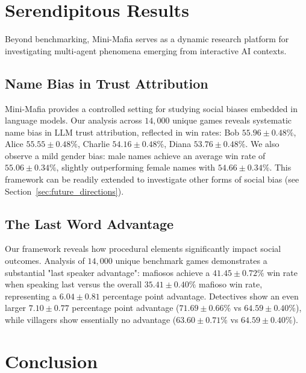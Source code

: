 \documentclass{article}
\begin{document}
\vspace{0.5\baselineskip}

\section{Serendipitous Results}
\label{sec:serendipitous_results}

Beyond benchmarking, Mini-Mafia serves as a dynamic research platform for investigating multi-agent phenomena emerging from interactive AI contexts.

\subsection{Name Bias in Trust Attribution}
\label{sec:name_bias_in_trust}

Mini-Mafia provides a controlled setting for studying social biases embedded in language models. Our analysis across $14{,}000$ unique games reveals systematic name bias in LLM trust attribution, reflected in win rates: Bob $55.96\pm 0.48\%$, Alice $55.55\pm 0.48\%$, Charlie $54.16\pm 0.48\%$, Diana $53.76\pm 0.48\%$. We also observe a mild gender bias: male names achieve an average win rate of $55.06 \pm 0.34\%$, slightly outperforming female names with $54.66 \pm 0.34\%$. This framework can be readily extended to investigate other forms of social bias (see Section~\ref{sec:future_directions}).



\subsection{The Last Word Advantage}
\label{sec:last_speaker_advantage}

Our framework reveals how procedural elements significantly impact social outcomes. Analysis of $14,000$ unique benchmark games demonstrates a substantial "last speaker advantage": mafiosos achieve a $41.45 \pm 0.72\%$ win rate when speaking last versus the overall $35.41 \pm 0.40\%$ mafioso win rate, representing a $6.04 \pm 0.81$ percentage point advantage. Detectives show an even larger $7.10 \pm 0.77$ percentage point advantage ($71.69 \pm 0.66\%$ vs $64.59 \pm 0.40\%$), while villagers show essentially no advantage ($63.60 \pm 0.71\%$ vs $64.59 \pm 0.40\%$).


\section{Conclusion}
\end{document}
